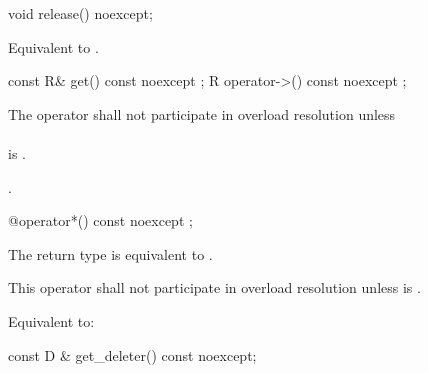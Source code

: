 \documentclass[ebook,11pt,article]{memoir}
\begin{document}

\begin{itemdecl}
void release() noexcept;
\end{itemdecl}

\begin{itemdescr}
\pnum
\effects 
Equivalent to .
\end{itemdescr}


\begin{itemdecl}
const R& get() const noexcept ;
R operator->() const noexcept ;
\end{itemdecl}

\begin{itemdescr}
\pnum
\remarks 
The operator
shall not participate in overload resolution unless \\
 \\
 is . 

\pnum
\returns {}.
\end{itemdescr}

\begin{itemdecl}
@\seebelow@ operator*() const noexcept ;
\end{itemdecl}

\begin{itemdescr}

\pnum
\requires
The return type is equivalent to 
. 

\pnum
\remarks 
This operator shall not participate in overload resolution unless  is .

\pnum
\effects 
Equivalent to:\\
\end{itemdescr}


\begin{itemdecl}
const D & get_deleter() const noexcept;
\end{itemdecl}
\end{document}
